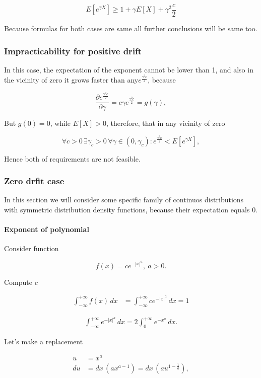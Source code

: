 \documentclass[12pt, a4paper]{article}
\theoremstyle{remark}
\newcommand{\expx}[1]{e^{-|x|^{#1}}}
\newcommand{\expxpoz}[1]{e^{-x^{#1}}}
\newcommand{\infint}[1]{\int_{-\infty}^{+\infty} #1 \, dx}
\newcommand{\infintpoz}[1]{\int_{0}^{+\infty} #1 \, dx}
\begin{document}
\[
E[e^{\gamma X}] \geq 1 + \gamma E[X] + \gamma^2 \frac{c}{2}  
\]

Because formulas for both cases are same all further conclusions will be same too.

\subsubsection{Impracticability for positive drift}

In this case, the expectation of the exponent cannot be lower than 1, and also in the vicinity of zero it grows faster than any$e^{\frac{\gamma^2 c}{2}}$, because
        
$$\frac{\partial e^{\frac{\gamma^2 c}{2}}}{\partial \gamma} = c\gamma e^{\frac{\gamma^2 c}{2}} = g(\gamma),$$

But $g(0) = 0$, while $E[X] > 0$, therefore, that in any vicinity of zero

$$\forall c > 0 \, \exists \gamma_c > 0 \, \forall \gamma \in (0, \gamma_c) : e^{\frac{\gamma^2 c}{2}} < E[e^{\gamma X}],$$

Hence both of requirements are not feasible.

\subsubsection{Zero drfit case}
\label{sec:zero}

In this section we will consider some specific family of continuos distributions with symmetric distribution density functions, because their expectation equals 0.

\paragraph*{Exponent of polynomial}

Consider function

$$f(x) = c \expx{a},\ a > 0.$$

Compute $c$

\begin{align*}
    \infint{f(x)} &= \infint{c\expx{a}} = 1
\end{align*}

\begin{align*}
    \infint{\expx{a}} = 2\infintpoz{\expxpoz{a}}.
\end{align*}

Let's make a replacement

\begin{align*}
    u &= x^a \\
    du &= dx\,(a x^{a - 1}) = dx\,(a u^{1 - \frac{1}{a}}),
\end{align*}
\end{document}
